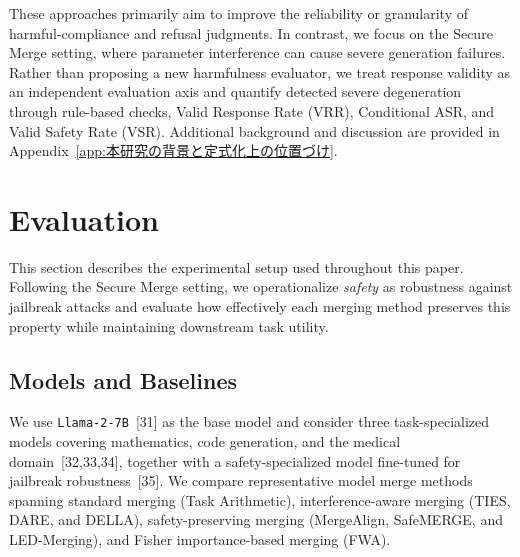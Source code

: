 \documentclass{article}
\begin{document}
These approaches primarily aim to improve the reliability or granularity of harmful-compliance and refusal judgments. In contrast, we focus on the Secure Merge setting, where parameter interference can cause severe generation failures. Rather than proposing a new harmfulness evaluator, we treat response validity as an independent evaluation axis and quantify detected severe degeneration through rule-based checks, Valid Response Rate (VRR), Conditional ASR, and Valid Safety Rate (VSR). Additional background and discussion are provided in Appendix~\ref{app:本研究の背景と定式化上の位置づけ}.


\section{Evaluation}

This section describes the experimental setup used throughout this paper. Following the Secure Merge setting, we operationalize \emph{safety} as robustness against jailbreak attacks and evaluate how effectively each merging method preserves this property while maintaining downstream task utility.


\subsection{Models and Baselines}

We use \texttt{Llama-2-7B}~[31] as the base model and consider three task-specialized models covering mathematics, code generation, and the medical domain~[32,33,34], together with a safety-specialized model fine-tuned for jailbreak robustness~[35]. We compare representative model merge methods spanning standard merging (Task Arithmetic), interference-aware merging (TIES, DARE, and DELLA), safety-preserving merging (MergeAlign, SafeMERGE, and LED-Merging), and Fisher importance-based merging (FWA).
\end{document}
